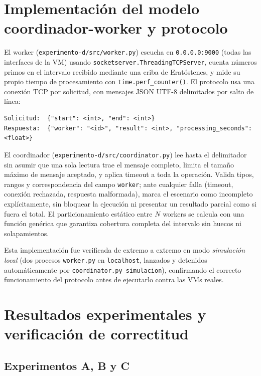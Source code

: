 \documentclass[11pt]{article}
\begin{document}
\section{Implementación del modelo coordinador-worker y protocolo}

El worker (\texttt{experimento-d/src/worker.py}) escucha en
\texttt{0.0.0.0:9000} (todas las interfaces de la VM) usando
\texttt{socketserver.ThreadingTCPServer}, cuenta números primos en el
intervalo recibido mediante una criba de Eratóstenes, y mide su propio
tiempo de procesamiento con \texttt{time.perf\_counter()}. El protocolo usa
una conexión TCP por solicitud, con mensajes JSON UTF-8 delimitados por
salto de línea:

\begin{verbatim}
Solicitud:  {"start": <int>, "end": <int>}
Respuesta:  {"worker": "<id>", "result": <int>, "processing_seconds": <float>}
\end{verbatim}

El coordinador (\texttt{experimento-d/src/coordinator.py}) lee hasta el
delimitador sin asumir que una sola lectura trae el mensaje completo, limita
el tamaño máximo de mensaje aceptado, y aplica timeout a toda la operación.
Valida tipos, rangos y correspondencia del campo \texttt{worker}; ante
cualquier falla (timeout, conexión rechazada, respuesta malformada), marca
el escenario como incompleto explícitamente, sin bloquear la ejecución ni
presentar un resultado parcial como si fuera el total. El particionamiento
estático entre $N$ workers se calcula con una función genérica que garantiza
cobertura completa del intervalo sin huecos ni solapamientos.

Esta implementación fue verificada de extremo a extremo en modo
\emph{simulación local} (dos procesos \texttt{worker.py} en \texttt{localhost},
lanzados y detenidos automáticamente por
\texttt{coordinator.py simulacion}), confirmando el correcto funcionamiento
del protocolo antes de ejecutarlo contra las VMs reales.

\section{Resultados experimentales y verificación de correctitud}

\subsection{Experimentos A, B y C}
\end{document}
